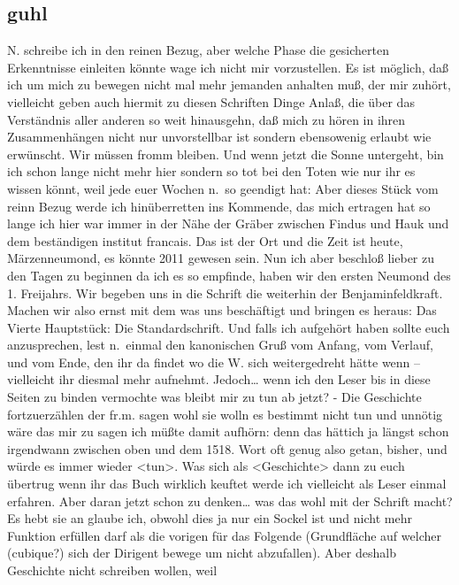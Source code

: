 \documentclass[
]{article}
\author{}
\date{\vspace{-2.5em}}
\begin{document}
\subsection{guhl}\label{guhl}

N. schreibe ich in den reinen Bezug, aber welche Phase die gesicherten
Erkenntnisse einleiten könnte wage ich nicht mir vorzustellen. Es ist
möglich, daß ich um mich zu bewegen nicht mal mehr jemanden anhalten
muß, der mir zuhört, vielleicht geben auch hiermit zu diesen Schriften
Dinge Anlaß, die über das Verständnis aller anderen so weit hinausgehn,
daß mich zu hören in ihren Zusammenhängen nicht nur unvorstellbar ist
sondern ebensowenig erlaubt wie erwünscht. Wir müssen fromm bleiben. Und
wenn jetzt die Sonne untergeht, bin ich schon lange nicht mehr hier
sondern so tot bei den Toten wie nur ihr es wissen könnt, weil jede euer
Wochen n.~so geendigt hat: Aber dieses Stück vom reinn Bezug werde ich
hinüberretten ins Kommende, das mich ertragen hat so lange ich hier war
immer in der Nähe der Gräber zwischen Findus und Hauk und dem
beständigen institut francais. Das ist der Ort und die Zeit ist heute,
Märzenneumond, es könnte 2011 gewesen sein. Nun ich aber beschloß lieber
zu den Tagen zu beginnen da ich es so empfinde, haben wir den ersten
Neumond des 1. Freijahrs. Wir begeben uns in die Schrift die weiterhin
der Benjaminfeldkraft. Machen wir also ernst mit dem was uns beschäftigt
und bringen es heraus: Das Vierte Hauptstück: Die Standardschrift. Und
falls ich aufgehört haben sollte euch anzusprechen, lest n.~einmal den
kanonischen Gruß vom Anfang, vom Verlauf, und vom Ende, den ihr da
findet wo die W. sich weitergedreht hätte wenn -- vielleicht ihr diesmal
mehr aufnehmt. Jedoch\ldots{} wenn ich den Leser bis in diese Seiten zu
binden vermochte was bleibt mir zu tun ab jetzt? - Die Geschichte
fortzuerzählen der fr.m. sagen wohl sie wolln es bestimmt nicht tun und
unnötig wäre das mir zu sagen ich müßte damit aufhörn: denn das hättich
ja längst schon irgendwann zwischen oben und dem 1518. Wort oft genug
also getan, bisher, und würde es immer wieder \textless tun\textgreater.
Was sich als \textless Geschichte\textgreater{} dann zu euch übertrug
wenn ihr das Buch wirklich keuftet werde ich vielleicht als Leser einmal
erfahren. Aber daran jetzt schon zu denken\ldots{} was das wohl mit der
Schrift macht? Es hebt sie an glaube ich, obwohl dies ja nur ein Sockel
ist und nicht mehr Funktion erfüllen darf als die vorigen für das
Folgende (Grundfläche auf welcher (cubique?) sich der Dirigent bewege um
nicht abzufallen). Aber deshalb Geschichte nicht schreiben wollen, weil
\end{document}
